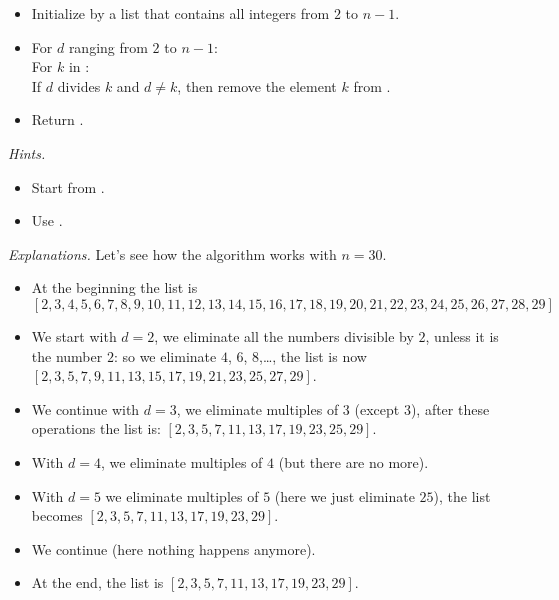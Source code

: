 \documentclass[11pt,class=report,crop=false]{standalone}
\begin{document}
\begin{activite}[Arithmetic]
\begin{enumerate}
\begin{algorithme}
\begin{itemize}
  
  \item Initialize  by a list that contains all integers from $2$ to $n-1$. 
   
   \item For $d$ ranging from $2$ to $n-1$:\\
   \indentation For $k$ in :\\
   \indentation\indentation If $d$ divides $k$ and $d \neq k$, then
remove the element $k$ from .
   \item Return .
 \end{itemize}  
 \end{algorithme}
 

  \emph{Hints.}  
  \begin{itemize}
    \item Start from .
    \item Use .
   \end{itemize} 
   
   \medskip
   
  \emph{Explanations.}
  Let's see how the algorithm works with $n=30$.
  \begin{itemize}
    \item At the beginning the list is 
    $$[2,3,4,5,6,7,8,9,10,11,12,13,14,15,16,17,18,19,20,21,22,23,24,25,26,27,28,29]$$
    
    \item We start with $d=2$, we eliminate all the numbers divisible by $2$, unless it is the number $2$: so we eliminate $4$, $6$, $8$,\ldots, the list is now $[2,3,5,7,9,11,13,15,17,19,21,23,25,27,29]$.
    \item We continue with $d=3$, we eliminate multiples of $3$ (except $3$), after these operations the list is: $[2,3,5,7,11,13,17,19,23,25,29]$.
    \item With $d=4$, we eliminate multiples of $4$ (but there are no more).
    \item With $d=5$ we eliminate multiples of $5$ (here we just eliminate $25$), the list becomes $[2,3,5,7,11,13,17,19,23,29]$.
    \item We continue (here nothing happens anymore).
    
    \item At the end, the list is $[2,3,5,7,11,13,17,19,23,29]$.
  \end{itemize}
     
\end{enumerate}

\end{activite}
\end{document}
